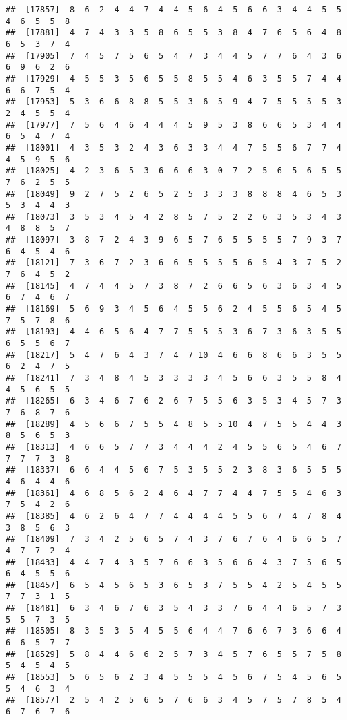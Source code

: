 \documentclass[
]{book}
\begin{document}
\begin{verbatim}
##  [17857]  8  6  2  4  4  7  4  4  5  6  4  5  6  6  3  4  4  5  5  4  6  5  5  8
##  [17881]  4  7  4  3  3  5  8  6  5  5  3  8  4  7  6  5  6  4  8  6  5  3  7  4
##  [17905]  7  4  5  7  5  6  5  4  7  3  4  4  5  7  7  6  4  3  6  6  9  6  2  6
##  [17929]  4  5  5  3  5  6  5  5  8  5  5  4  6  3  5  5  7  4  4  6  6  7  5  4
##  [17953]  5  3  6  6  8  8  5  5  3  6  5  9  4  7  5  5  5  5  3  2  4  5  5  4
##  [17977]  7  5  6  4  6  4  4  4  5  9  5  3  8  6  6  5  3  4  4  6  5  4  7  4
##  [18001]  4  3  5  3  2  4  3  6  3  3  4  4  7  5  5  6  7  7  4  4  5  9  5  6
##  [18025]  4  2  3  6  5  3  6  6  6  3  0  7  2  5  6  5  6  5  5  7  6  2  5  5
##  [18049]  9  2  7  5  2  6  5  2  5  3  3  3  8  8  8  4  6  5  3  5  3  4  4  3
##  [18073]  3  5  3  4  5  4  2  8  5  7  5  2  2  6  3  5  3  4  3  4  8  8  5  7
##  [18097]  3  8  7  2  4  3  9  6  5  7  6  5  5  5  5  7  9  3  7  6  4  5  4  6
##  [18121]  7  3  6  7  2  3  6  6  5  5  5  5  6  5  4  3  7  5  2  7  6  4  5  2
##  [18145]  4  7  4  4  5  7  3  8  7  2  6  6  5  6  3  6  3  4  5  6  7  4  6  7
##  [18169]  5  6  9  3  4  5  6  4  5  5  6  2  4  5  5  6  5  4  5  7  5  7  8  6
##  [18193]  4  4  6  5  6  4  7  7  5  5  5  3  6  7  3  6  3  5  5  6  5  5  6  7
##  [18217]  5  4  7  6  4  3  7  4  7 10  4  6  6  8  6  6  3  5  5  6  2  4  7  5
##  [18241]  7  3  4  8  4  5  3  3  3  3  4  5  6  6  3  5  5  8  4  4  5  6  5  5
##  [18265]  6  3  4  6  7  6  2  6  7  5  5  6  3  5  3  4  5  7  3  7  6  8  7  6
##  [18289]  4  5  6  6  7  5  5  4  8  5  5 10  4  7  5  5  4  4  3  8  5  6  5  3
##  [18313]  4  6  6  5  7  7  3  4  4  4  2  4  5  5  6  5  4  6  7  7  7  7  3  8
##  [18337]  6  6  4  4  5  6  7  5  3  5  5  2  3  8  3  6  5  5  5  4  6  4  4  6
##  [18361]  4  6  8  5  6  2  4  6  4  7  7  4  4  7  5  5  4  6  3  7  5  4  2  6
##  [18385]  4  6  2  6  4  7  7  4  4  4  4  5  5  6  7  4  7  8  4  3  8  5  6  3
##  [18409]  7  3  4  2  5  6  5  7  4  3  7  6  7  6  4  6  6  5  7  4  7  7  2  4
##  [18433]  4  4  7  4  3  5  7  6  6  3  5  6  6  4  3  7  5  6  5  6  4  5  5  6
##  [18457]  6  5  4  5  6  5  3  6  5  3  7  5  5  4  2  5  4  5  5  7  7  3  1  5
##  [18481]  6  3  4  6  7  6  3  5  4  3  3  7  6  4  4  6  5  7  3  5  5  7  3  5
##  [18505]  8  3  5  3  5  4  5  5  6  4  4  7  6  6  7  3  6  6  4  6  6  5  7  7
##  [18529]  5  8  4  4  6  6  2  5  7  3  4  5  7  6  5  5  7  5  8  5  4  5  4  5
##  [18553]  5  6  5  6  2  3  4  5  5  5  4  5  6  7  5  4  5  6  5  5  4  6  3  4
##  [18577]  2  5  4  2  5  6  5  7  6  6  3  4  5  7  5  7  8  5  4  6  7  6  7  6

\end{verbatim}
\end{document}
